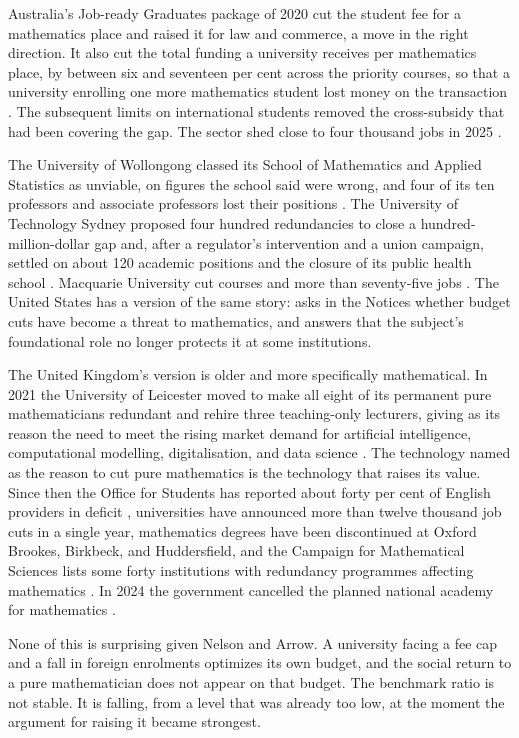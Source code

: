 \documentclass[11pt]{article}
\theoremstyle{definition}
\theoremstyle{remark}
\begin{document}
Australia's Job-ready Graduates package of 2020 cut the student fee for a mathematics place and raised it for law and commerce, a move in the right direction. It also cut the total funding a university receives per mathematics place, by between six and seventeen per cent across the priority courses, so that a university enrolling one more mathematics student lost money on the transaction \citep{norton2020}. The subsequent limits on international students removed the cross-subsidy that had been covering the gap. The sector shed close to four thousand jobs in 2025 \citep{abc2025}.

The University of Wollongong classed its School of Mathematics and Applied Statistics as unviable, on figures the school said were wrong, and four of its ten professors and associate professors lost their positions \citep{abcuow2025}. The University of Technology Sydney proposed four hundred redundancies to close a hundred-million-dollar gap and, after a regulator's intervention and a union campaign, settled on about 120 academic positions and the closure of its public health school \citep{abcuts2025, campusreview2025}. Macquarie University cut courses and more than seventy-five jobs \citep{nteu2025}. The United States has a version of the same story: \citet{fuller2024} asks in the Notices whether budget cuts have become a threat to mathematics, and answers that the subject's foundational role no longer protects it at some institutions.

The United Kingdom's version is older and more specifically mathematical. In 2021 the University of Leicester moved to make all eight of its permanent pure mathematicians redundant and rehire three teaching-only lecturers, giving as its reason the need to meet the rising market demand for artificial intelligence, computational modelling, digitalisation, and data science \citep{gowers2021}. The technology named as the reason to cut pure mathematics is the technology that raises its value. Since then the Office for Students has reported about forty per cent of English providers in deficit \citep{commons2025}, universities have announced more than twelve thousand job cuts in a single year, mathematics degrees have been discontinued at Oxford Brookes, Birkbeck, and Huddersfield, and the Campaign for Mathematical Sciences lists some forty institutions with redundancy programmes affecting mathematics \citep{cams2026}. In 2024 the government cancelled the planned national academy for mathematics \citep{the2025}.

None of this is surprising given Nelson and Arrow. A university facing a fee cap and a fall in foreign enrolments optimizes its own budget, and the social return to a pure mathematician does not appear on that budget. The benchmark ratio is not stable. It is falling, from a level that was already too low, at the moment the argument for raising it became strongest.
\end{document}

